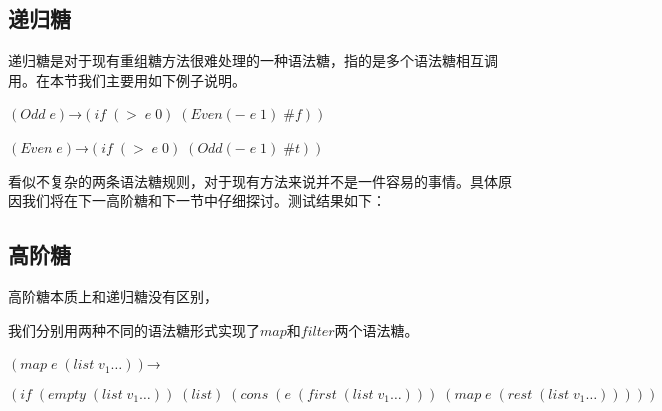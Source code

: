 \subsection{递归糖}

递归糖是对于现有重组糖方法很难处理的一种语法糖，指的是多个语法糖相互调用。在本节我们主要用如下例子说明。

$(Odd\;e)$→$(if\;(>\;e\;0)\;(Even (-\;e\;1)\;\#f))$

$(Even\;e)$→$(if\;(>\;e\;0)\;(Odd (-\;e\;1)\;\#t))$

看似不复杂的两条语法糖规则，对于现有方法来说并不是一件容易的事情。具体原因我们将在下一高阶糖和下一节中仔细探讨。测试结果如下：

\begin{center}
\end{center}

\subsection{高阶糖}

高阶糖本质上和递归糖没有区别，

我们分别用两种不同的语法糖形式实现了$map$和$filter$两个语法糖。
\begin{flushleft}
	$(map\;e\;(list\;v_1\ldots))$→
	
	$(if\;(empty\;(list\;v_1\ldots))\;(list)\;(cons\;(e\;(first\;(list\;v_1\ldots)))\;(map\;e\;(rest\;(list\;v_1\ldots)))))$
\end{flushleft}

